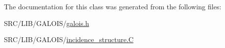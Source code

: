 The documentation for this class was generated from the following files\+:\begin{DoxyCompactItemize}
\item 
S\+R\+C/\+L\+I\+B/\+G\+A\+L\+O\+I\+S/\mbox{\hyperlink{galois_8h}{galois.\+h}}\item 
S\+R\+C/\+L\+I\+B/\+G\+A\+L\+O\+I\+S/\mbox{\hyperlink{_g_a_l_o_i_s_2incidence__structure_8_c}{incidence\+\_\+structure.\+C}}\end{DoxyCompactItemize}
